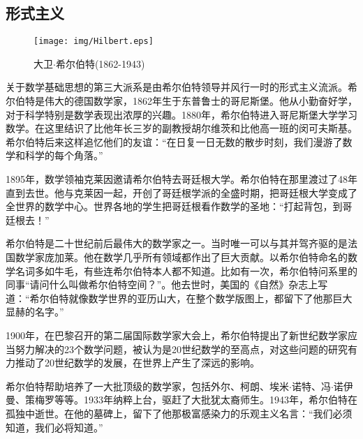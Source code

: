 \documentclass{article}
\begin{document}
\subsection{形式主义}

\begin{wrapfigure}{L}{0.5\textwidth}
 \centering
 \texttt{[image: img/Hilbert.eps]}
 \captionsetup{labelformat=empty}
 \caption{大卫$\cdot$希尔伯特(1862-1943)}
 \label{fig:Hilbert}
\end{wrapfigure}

关于数学基础思想的第三大派系是由希尔伯特领导并风行一时的形式主义流派。希尔伯特是伟大的德国数学家，1862年生于东普鲁士的哥尼斯堡。他从小勤奋好学，对于科学特别是数学表现出浓厚的兴趣。1880年，希尔伯特进入哥尼斯堡大学学习数学。在这里结识了比他年长三岁的副教授胡尔维茨和比他高一班的闵可夫斯基。希尔伯特后来这样追忆他们的友谊：“在日复一日无数的散步时刻，我们漫游了数学和科学的每个角落。”


1895年，数学领袖克莱因邀请希尔伯特去哥廷根大学。希尔伯特在那里渡过了48年直到去世。他与克莱因一起，开创了哥廷根学派的全盛时期，把哥廷根大学变成了全世界的数学中心。世界各地的学生把哥廷根看作数学的圣地：“打起背包，到哥廷根去！”

希尔伯特是二十世纪前后最伟大的数学家之一。当时唯一可以与其并驾齐驱的是法国数学家庞加莱。他在数学几乎所有领域都作出了巨大贡献。以希尔伯特命名的数学名词多如牛毛，有些连希尔伯特本人都不知道。比如有一次，希尔伯特问系里的同事“请问什么叫做希尔伯特空间？”。他去世时，美国的《自然》杂志上写道：“希尔伯特就像数学世界的亚历山大，在整个数学版图上，都留下了他那巨大显赫的名字。”\cite{HanXueTao16}

1900年，在巴黎召开的第二届国际数学家大会上，希尔伯特提出了新世纪数学家应当努力解决的23个数学问题，被认为是20世纪数学的至高点，对这些问题的研究有力推动了20世纪数学的发展，在世界上产生了深远的影响。

希尔伯特帮助培养了一大批顶级的数学家，包括外尔、柯朗、埃米$\cdot$诺特、冯$\cdot$诺伊曼、策梅罗等等。1933年纳粹上台，驱赶了大批犹太裔师生。1943年，希尔伯特在孤独中逝世。在他的墓碑上，留下了他那极富感染力的乐观主义名言：“我们必须知道，我们必将知道。”
\end{document}
